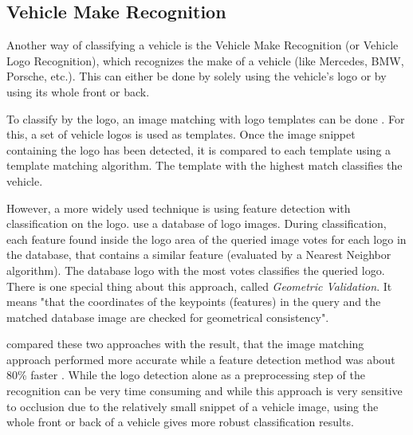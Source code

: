 \subsection{Vehicle Make Recognition}
Another way of classifying a vehicle is the Vehicle Make Recognition (or Vehicle Logo Recognition), which recognizes the make of a vehicle (like Mercedes, BMW, Porsche, etc.). This can either be done by solely using the vehicle's logo or by using its whole front or back.

To classify by the logo, an image matching with logo templates can be done \citep{jain2015car} \citep{wang2007fast}. For this, a set of vehicle logos is used as templates. Once the image snippet containing the logo has been detected, it is compared to each template using a template matching algorithm. The template with the highest match classifies the vehicle.

However, a more widely used technique is using feature detection with classification on the logo. \citeauthor{psyllos2010vehicle} use a database of logo images. During classification, each feature found inside the logo area of the queried image votes for each logo in the database, that contains a similar feature (evaluated by a Nearest Neighbor algorithm). The database logo with the most votes classifies the queried logo. There is one special thing about this approach, called \emph{Geometric Validation}. It means "that the coordinates of the keypoints (features) in the query and the matched database image are checked for geometrical consistency".

\citeauthor{rezaeivehicle} compared these two approaches with the result, that the image matching approach performed more accurate while a feature detection method was about 80\% faster \citep{rezaeivehicle}. While the logo detection alone as a preprocessing step of the recognition can be very time consuming \citep{siddiqui2015robust} and while this approach is very sensitive to occlusion due to the relatively small snippet of a vehicle image, using the whole front or back of a vehicle gives more robust classification results.

